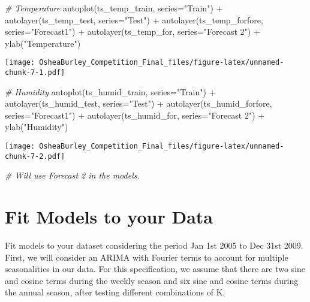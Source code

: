 \documentclass[
]{article}
\newenvironment{Shaded}{\begin{snugshade}}{\end{snugshade}}
\newcommand{\AttributeTok}[1]{\textcolor[rgb]{0.77,0.63,0.00}{#1}}
\newcommand{\CommentTok}[1]{\textcolor[rgb]{0.56,0.35,0.01}{\textit{#1}}}
\newcommand{\FunctionTok}[1]{\textcolor[rgb]{0.00,0.00,0.00}{#1}}
\newcommand{\NormalTok}[1]{#1}
\newcommand{\SpecialCharTok}[1]{\textcolor[rgb]{0.00,0.00,0.00}{#1}}
\newcommand{\StringTok}[1]{\textcolor[rgb]{0.31,0.60,0.02}{#1}}
\begin{document}
\begin{Shaded}
\begin{Highlighting}[]
\CommentTok{\# Temperature}
\FunctionTok{autoplot}\NormalTok{(ts\_temp\_train, }\AttributeTok{series=}\StringTok{"Train"}\NormalTok{) }\SpecialCharTok{+}
  \FunctionTok{autolayer}\NormalTok{(ts\_temp\_test, }\AttributeTok{series=}\StringTok{"Test"}\NormalTok{) }\SpecialCharTok{+}
  \FunctionTok{autolayer}\NormalTok{(ts\_temp\_forfore, }\AttributeTok{series=}\StringTok{"Forecast1"}\NormalTok{) }\SpecialCharTok{+}
  \FunctionTok{autolayer}\NormalTok{(ts\_temp\_for, }\AttributeTok{series=}\StringTok{"Forecast 2"}\NormalTok{) }\SpecialCharTok{+}
  \FunctionTok{ylab}\NormalTok{(}\StringTok{"Temperature"}\NormalTok{)}
\end{Highlighting}
\end{Shaded}

\texttt{[image: OsheaBurley\_Competition\_Final\_files/figure-latex/unnamed-chunk-7-1.pdf]}

\begin{Shaded}
\begin{Highlighting}[]
\CommentTok{\# Humidity}
\FunctionTok{autoplot}\NormalTok{(ts\_humid\_train, }\AttributeTok{series=}\StringTok{"Train"}\NormalTok{) }\SpecialCharTok{+}
  \FunctionTok{autolayer}\NormalTok{(ts\_humid\_test, }\AttributeTok{series=}\StringTok{"Test"}\NormalTok{) }\SpecialCharTok{+}
  \FunctionTok{autolayer}\NormalTok{(ts\_humid\_forfore, }\AttributeTok{series=}\StringTok{"Forecast1"}\NormalTok{) }\SpecialCharTok{+}
  \FunctionTok{autolayer}\NormalTok{(ts\_humid\_for, }\AttributeTok{series=}\StringTok{"Forecast 2"}\NormalTok{) }\SpecialCharTok{+}
  \FunctionTok{ylab}\NormalTok{(}\StringTok{"Humidity"}\NormalTok{)}
\end{Highlighting}
\end{Shaded}

\texttt{[image: OsheaBurley\_Competition\_Final\_files/figure-latex/unnamed-chunk-7-2.pdf]}

\begin{Shaded}
\begin{Highlighting}[]
\CommentTok{\# Will use Forecast 2 in the models.}
\end{Highlighting}
\end{Shaded}

\hypertarget{fit-models-to-your-data}{%
\section{Fit Models to your Data}\label{fit-models-to-your-data}}

Fit models to your dataset considering the period Jan 1st 2005 to Dec
31st 2009. First, we will consider an ARIMA with Fourier terms to
account for multiple seasonalities in our data. For this specification,
we assume that there are two sine and cosine terms during the weekly
season and six sine and cosine terms during the annual season, after
testing different combinations of K.
\end{document}
